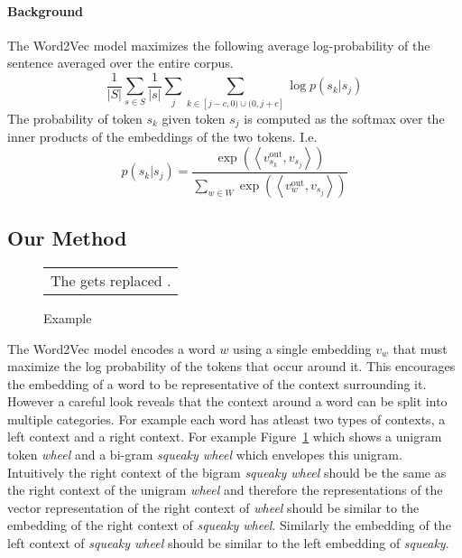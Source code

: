 \documentclass{article}
\newcommand{\figref}[1]{Figure~\ref{#1}}
\newcommand{\vo}[1]{v^{\textrm{out}}_{#1}}
\newcommand{\ip}[2]{\left\langle#1, #2\right\rangle}
\newcommand{\wv}{Word2Vec\xspace}
\begin{document}
\paragraph{Background} The \wv model maximizes the following average log-probability of the
sentence averaged over the entire corpus.
\begin{equation}
  \label{eq:w2vec1}
  \frac{1}{|S|} \sum_{s \in S} \frac{1}{|s|} \sum_{j} \sum_{k \in [j-c,0) \cup (0,j+c]} \log p(s_k | s_j)
\end{equation}
\noindent The probability of token $s_k$ given token $s_j$ is computed as the
softmax over the inner products of the embeddings of the two tokens. I.e.
\begin{equation}
  \label{eq:w2vec2}
  p(s_k | s_j) = \frac{\exp\left(\ip{\vo{s_k}}{v_{s_j}}\right)}{\sum_{w \in W}\exp\left(\ip{\vo{w}}{v_{s_j}}\right)}
\end{equation}

\subsection{Our Method}
\label{ssec:our-method}
\begin{figure}[htbp]
  \centering
  \begin{tabular}{c}
      The \framebox{squeaky \framebox{wheel}} gets replaced .
  \end{tabular}
  \caption{Example}
  \label{fig:pretty-example}
\end{figure}
The \wv model encodes a word $w$ using a single embedding $v_w$ that must
maximize the log probability of the tokens that occur around it. This encourages
the embedding of a word to be representative of the context surrounding
it. However a careful look reveals that the context around a word can be split
into multiple categories. For example each word has atleast two types of
contexts, a left context and a right context.
For example \figref{fig:pretty-example} which shows a unigram token \textit{wheel}
and a bi-gram \textit{squeaky wheel} which envelopes this unigram. Intuitively the
right context of the bigram \textit{squeaky wheel} should be the same as the
right context of the unigram \textit{wheel} and therefore the representations
of the vector representation of the right context of \textit{wheel} should be
similar to the embedding of the right context of \textit{squeaky
  wheel}. Similarly the embedding of the left context of \textit{squeaky wheel} should be
similar to the left embedding of \textit{squeaky}.
\end{document}
